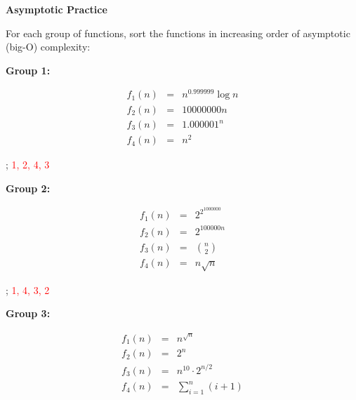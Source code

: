 \documentclass[12pt,twoside]{article}
\begin{document}
\begin{problems}

    \problem {} \textbf{Asymptotic Practice}

    For each group of functions, sort the functions in increasing order of
    asymptotic (big-O) complexity:

    \begin{problemparts}

        \problempart {} \textbf{Group 1:}

        $$
            \begin{array}{rcl}
                f_1(n) & = & n^{0.999999} \log n \\
                f_2(n) & = & 10000000 n          \\
                f_3(n) & = & 1.000001^n          \\
                f_4(n) & = & n^2
            \end{array}
        $$

        \ifsolution \solution{}
            \sout{}; \textcolor{red}{1, 2, 4, 3}
        \fi

        \problempart {} \textbf{Group 2:}

        $$
            \begin{array}{rcl}
                f_1(n) & = & 2^{2^{1000000}}            \\
                f_2(n) & = & 2^{100000n}                \\
                f_3(n) & = & \displaystyle \binom{n}{2} \\
                f_4(n) & = & n \sqrt{n}
            \end{array}
        $$

        \ifsolution \solution{}
            \sout{}; \textcolor{red}{1, 4, 3, 2}
        \fi

        \problempart {} \textbf{Group 3:}

        $$
            \begin{array}{rcl}
                f_1(n) & = & n^{\sqrt{n}}                          \\
                f_2(n) & = & 2^n                                   \\
                f_3(n) & = & n^{10} \cdot 2^{n / 2}                \\
                f_4(n) & = & \displaystyle\sum_{i = 1}^{n} (i + 1)
            \end{array}
        $$


\end{problemparts}
\end{problems}
\end{document}
